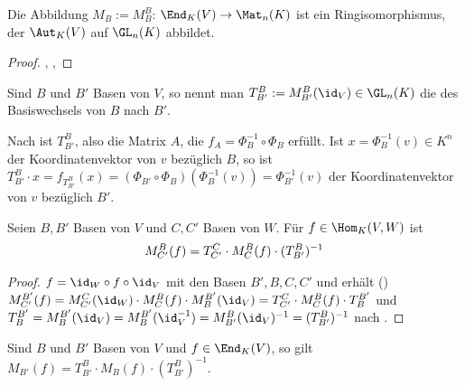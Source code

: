 \begin{conclusion}
	Die Abbildung $M_B:=M_B^B$: $\End_K(V)\to \Mat_n(K)$ ist ein Ringisomorphismus, der $\Aut_K(V)$ auf 
	$\GL_{n}(K)$ abbildet.
\end{conclusion}
\begin{proof}
	, , 
\end{proof}

\begin{definition}[Transformationsmatrix]
	Sind $B$ und $B'$ Basen von $V$, so nennt man $T_{B'}^B:=M_{B'}^B(\id_V)\in 
	\GL_{n}(K)$ die  des Basiswechsels von $B$ nach $B'$.
\end{definition}

\begin{remark}
	Nach  ist $T_{B'}^B$, also die Matrix $A$, die $f_A=\Phi_B^{-1}\circ \Phi_B$ 
	erfüllt. Ist $x=\Phi_B^{-1}(v)\in K^n$ der Koordinatenvektor von $v$ bezüglich $B$, so ist $T_{B'}^B\cdot 
	x=f_{T_{B'}^B}(x)=(\Phi_{B'}\circ \Phi_B)(\Phi_B^{-1}(v))=\Phi_{B'}^{-1}(v)$ der Koordinatenvektor von $v$ 
	bezüglich $B'$.
\end{remark}

\begin{proposition}[Transformationsformel]
	Seien $B,B'$ Basen von $V$ und $C,C'$ Basen von $W$. Für $f\in \Hom_K(V,W)$ ist 
	\begin{align}
		M_{C'}^B(f)=T_{C'}^C\cdot M_C^B(f)\cdot (T_{B'}^B)^{-1}\notag
	\end{align}
\end{proposition}
\begin{proof}
	$f=\id_W\circ f \circ \id_V$ mit den Basen $B',B,C,C'$ und erhält () $M_{C'}^{B'}(f)=M_{C'}^C(\id_W)\cdot M_C^B(f)\cdot
	M_B^{B'}(\id_V)=T_{C'}^C\cdot M_C^B(f)\cdot T_B^{B'}$ und $T_B^{B'}=M_B^{B'}(\id_V)=M_B^{B'}(\id_V^{-1})=M_{B'}^B(\id_V)^
	{-1}=(T_{B'}^B)^{-1}$ nach .
\end{proof}

\begin{conclusion}
	Sind $B$ und $B'$ Basen von $V$ und $f\in \End_K(V)$, so gilt $M_{B'}(f)=T_{B'}^B \cdot M_B(f)
	\cdot (T_{B'}^B)^{-1}$.
\end{conclusion}